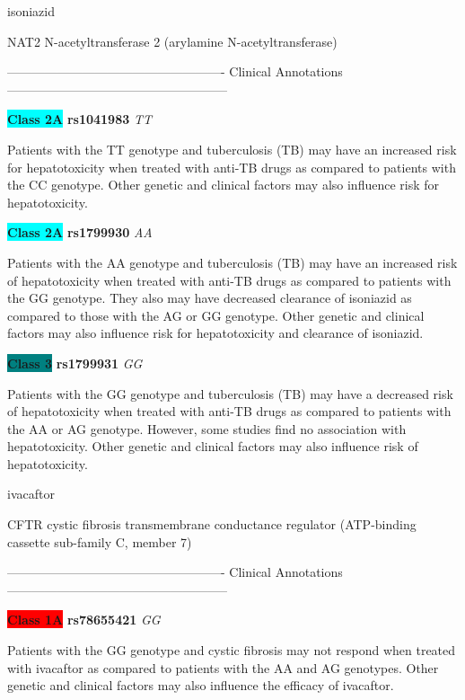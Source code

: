 \documentclass{resume} %
\begin{document}
\begin{rSection}{ isoniazid }
\begin{rSubsection}{ NAT2 }{ N-acetyltransferase 2 (arylamine N-acetyltransferase) }{}{}
\item[] ---------------------------------------------------- Clinical Annotations -----------------------------------------------------\newline
\item \textbf{\colorbox{cyan} {Class 2A}} \textbf{ rs1041983 } \textit{ TT }
\item[] Patients with the TT genotype and tuberculosis (TB) may have an increased risk for hepatotoxicity when treated with anti-TB drugs as compared to patients with the CC genotype. Other genetic and clinical factors may also influence risk for hepatotoxicity.\item \textbf{\colorbox{cyan} {Class 2A}} \textbf{ rs1799930 } \textit{ AA }
\item[] Patients with the AA genotype and tuberculosis (TB) may have an increased risk of hepatotoxicity when treated with anti-TB drugs as compared to patients with the GG genotype. They also may have decreased clearance of isoniazid as compared to those with the AG or GG genotype. Other genetic and clinical factors may also influence risk for hepatotoxicity and clearance of isoniazid.\item \textbf{\colorbox{teal} {Class 3}} \textbf{ rs1799931 } \textit{ GG }
\item[] Patients with the GG genotype and tuberculosis (TB) may have a decreased risk of hepatotoxicity when treated with anti-TB drugs as compared to patients with the AA or AG genotype. However, some studies find no association with hepatotoxicity. Other genetic and clinical factors may also influence risk of hepatotoxicity.
\end{rSubsection}

\end{rSection}\begin{rSection}{ ivacaftor }
\item[]

\begin{rSubsection}{ CFTR }{ cystic fibrosis transmembrane conductance regulator (ATP-binding cassette sub-family C, member 7) }{}{}
\item[]

\item[] ---------------------------------------------------- Clinical Annotations -----------------------------------------------------\newline
\item \textbf{\colorbox{red} {Class 1A}} \textbf{ rs78655421 } \textit{ GG }
\item[] Patients with the GG genotype and cystic fibrosis may not respond when treated with ivacaftor as compared to patients with the AA and AG genotypes. Other genetic and clinical factors may also influence the efficacy of ivacaftor.
\end{rSubsection}


\end{rSection}
\end{document}
